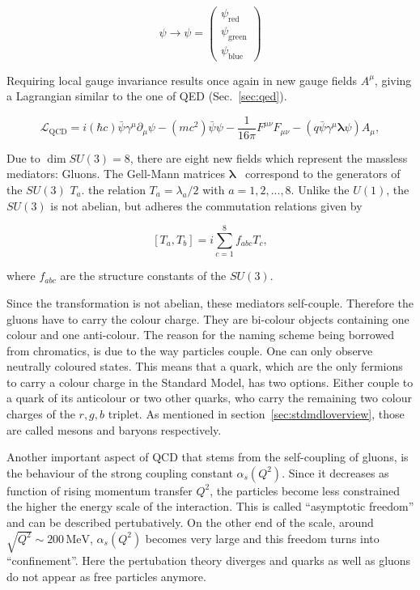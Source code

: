 \begin{equation}
  \label{eq:colorspinor}
  \psi \rightarrow \psi = \begin{pmatrix}
    \psi_{\text{red}} \\
    \psi_{\text{green}} \\
    \psi_{\text{blue}}
  \end{pmatrix}
\end{equation}

\noindent Requiring local gauge invariance results once again in new gauge fields $A^\mu$, giving a Lagrangian similar to the one of QED (Sec.~\ref{sec:qed}).

\begin{equation}
  \label{eq:qcdlagrangian}
  \mathcal{L}_{\text{QCD}} = i (\hbar c) \bar{\psi} \gamma^\mu \partial_\mu \psi - (m c^2) \bar{\psi} \psi - \frac{1}{16 \pi} F^{\mu \nu} F_{\mu \nu} - (q \bar{\psi} \gamma^\mu \mathbf{\lambda} \psi) A_\mu,
\end{equation}

Due to $\dim{SU(3)} = 8$, there are eight new fields which represent the massless mediators: Gluons. The Gell-Mann matrices $\mathbf{\lambda}$~\cite{gellmann} correspond to the generators of the $SU(3)$ $T_a$. the relation $T_a = \lambda_a / 2$ with $a = 1, 2, ..., 8$. Unlike the $U(1)$, the $SU(3)$ is not abelian, but adheres the commutation relations given by

\begin{equation}
  \label{eq:qcdgencommute}
  \left[ T_a, T_b \right] = i \sum_{c=1}^8 f_{abc} T_c,
\end{equation}

\noindent where $f_{abc}$ are the structure constants of the $SU(3)$. 

Since the transformation is not abelian, these mediators self-couple. Therefore the gluons have to carry the colour charge. They are bi-colour objects containing one colour and one anti-colour. The reason for the naming scheme being borrowed from chromatics, is due to the way particles couple. One can only observe neutrally coloured states. This means that a quark, which are the only fermions to carry a colour charge in the Standard Model, has two options. Either couple to a quark of its anticolour or two other quarks, who carry the remaining two colour charges of the $r,g,b$ triplet. As mentioned in section~\ref{sec:stdmdloverview}, those are called mesons and baryons respectively.

Another important aspect of QCD that stems from the self-coupling of gluons, is the behaviour of the strong coupling constant $\alpha_s(Q^2)$. Since it decreases as function of rising momentum transfer $Q^2$, the particles become less constrained the higher the energy scale of the interaction. This is called ``asymptotic freedom'' and can be described pertubatively. On the other end of the scale, around $\sqrt{Q^2} \sim 200\,\text{MeV}$, $\alpha_s(Q^2)$ becomes very large and this freedom turns into ``confinement''. Here the pertubation theory diverges and quarks as well as gluons do not appear as free particles anymore.

